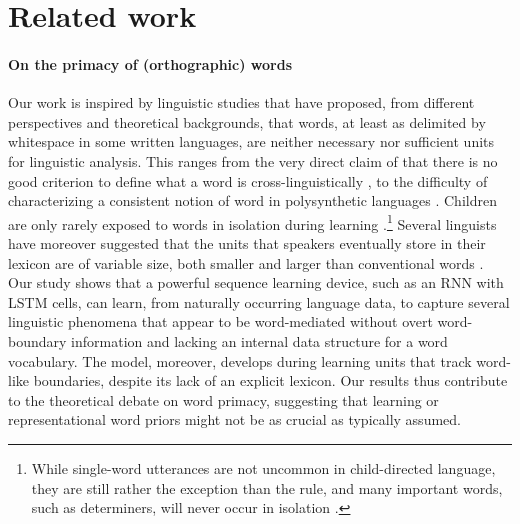 \section{Related work}
\label{sec:related}

\paragraph{On the primacy of (orthographic) words} Our work is
inspired by linguistic studies that have proposed, from different
perspectives and theoretical backgrounds, that words, at least as
delimited by whitespace in some written languages, are neither
necessary nor sufficient units for linguistic analysis. This ranges
from the very direct claim of  that there is
no good criterion to define what a word is cross-linguistically
\cite[see also][who address specifically the notion of prosodic
word]{Schiering:etal:2010}, to the difficulty of characterizing a
consistent notion of word in polysynthetic languages
\cite{Bickel:Zuniga:2017}. Children are only rarely exposed to words
in isolation during learning \cite{Tomasello:2003}.\footnote{While
  single-word utterances are not uncommon in child-directed language,
  they are still rather the exception than the rule, and many
  important words, such as determiners, will never occur in isolation
  \cite{Christiansen:etal:2005}.} Several linguists have moreover
suggested that the units that speakers eventually store in their
lexicon are of variable size, both smaller and larger than
conventional words \cite[e.g.,][]{Jackendoff:2002,Goldberg:2005}. Our
study shows that a powerful sequence learning device, such as an RNN
with LSTM cells, can learn, from naturally occurring language data, to
capture several linguistic phenomena that appear to be word-mediated
without overt word-boundary information and lacking an internal data
structure for a word vocabulary. The model, moreover, develops during
learning units that track word-like boundaries, despite its lack of an
explicit lexicon. Our results thus contribute to the theoretical
debate on word primacy, suggesting that learning or representational
word priors might not be as crucial as typically assumed.

